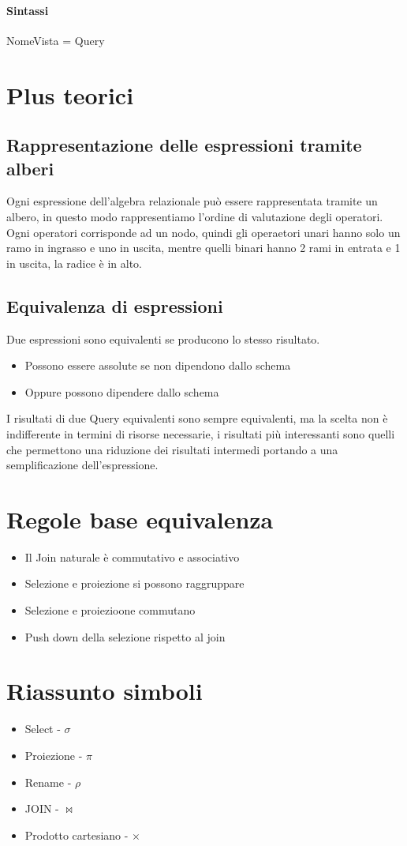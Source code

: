 \paragraph*{Sintassi} NomeVista = Query
\section{Plus teorici}
\subsection{Rappresentazione delle espressioni tramite alberi}
Ogni espressione dell'algebra relazionale può essere rappresentata tramite un albero, in questo modo
rappresentiamo l'ordine di valutazione degli operatori. Ogni operatori corrisponde
ad un nodo, quindi gli operaetori unari hanno solo un ramo in ingrasso e uno in uscita, mentre
quelli binari hanno 2 rami in entrata e 1 in uscita, la radice è in alto.\\
\subsection{Equivalenza di espressioni}
Due espressioni sono equivalenti se producono lo stesso risultato.
\begin{itemize}
    \item Possono essere assolute se non dipendono dallo schema
    \item Oppure possono dipendere dallo schema
\end{itemize}
I risultati di due Query equivalenti sono sempre equivalenti, ma la scelta non è 
indifferente in termini di risorse necessarie, i risultati più interessanti sono quelli che
permettono una riduzione dei risultati intermedi portando a una semplificazione dell'espressione.
\section{Regole base equivalenza}
\begin{itemize}
    \item Il Join naturale è commutativo e associativo
    \item Selezione e proiezione si possono raggruppare
    \item Selezione e proiezioone commutano
    \item Push down della selezione rispetto al join
\end{itemize}
\section{Riassunto simboli}
\begin{itemize}
    \item Select - $\sigma$
    \item Proiezione - $\pi$ 
    \item Rename - $\rho$
    \item JOIN - $\bowtie$
    \item Prodotto cartesiano - $\times$
\end{itemize}